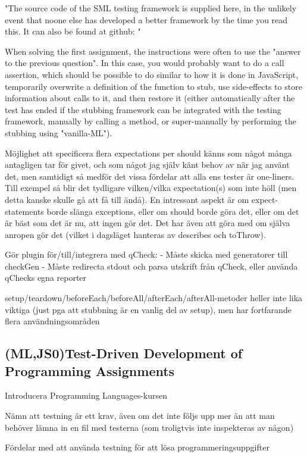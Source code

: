 \documentclass[11pt]{article}
\begin{document}
"The source code of the SML testing framework is supplied here, in the unlikely event that noone else has developed a better framework by the time you read this. It can also be found at github: \url{}"

When solving the first assignment, the instructions were often to use the "answer to the previous question". In this case, you would probably want to do a call assertion, which should be possible to do similar to how it is done in JavaScript, temporarily overwrite a definition of the function to stub, use side-effects to store information about calls to it, and then restore it (either automatically after the test has ended if the stubbing framework can be integrated with the testing framework, manually by calling a method, or super-manually by performing the stubbing using "vanilla-ML").

Möjlighet att specificera flera expectations per should känns som något många antagligen tar för givet, och som något jag själv känt behov av när jag använt det, men samtidigt så medför det vissa fördelar att alla ens tester är one-liners. Till exempel så blir det tydligare vilken/vilka expectation(s) som inte höll (men detta kanske skulle gå att få till ändå). En intressant aspekt är om expect-statements borde slänga exceptions, eller om should borde göra det, eller om det är bäst som det är nu, att ingen gör det. Det har även att göra med om själva anropen gör det (vilket i dagsläget hanteras av describes och toThrow).

Gör plugin för/till/integrera med qCheck:
- Måste skicka med generatorer till checkGen
- Måste redirecta stdout och parsa utskrift från qCheck, eller använda qChecks egna reporter

setup/teardown/beforeEach/beforeAll/afterEach/afterAll-metoder heller inte lika viktiga (just pga att stubbning är en vanlig del av setup), men har fortfarande flera användningsområden

\subsection{(ML,JS0)Test-Driven Development of Programming Assignments}
\label{subsec:tddmooc}

Introducera Programming Languages-kursen

Nämn att testning är ett krav, även om det inte följs upp mer än att man behöver lämna in en fil med testerna (som troligtvis inte inspekteras av någon)

Fördelar med att använda testning för att lösa programmeringsuppgifter
\end{document}
